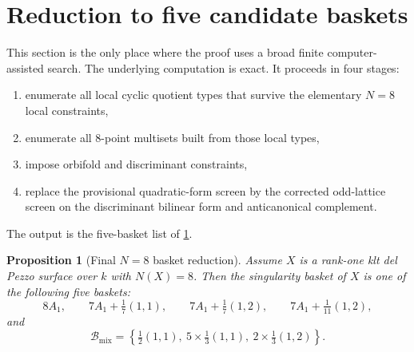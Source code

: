 \documentclass[11pt]{article}
\newtheorem{proposition}[proposition]{Proposition}
\theoremstyle{definition}
\begin{document}
\section{Reduction to five candidate baskets}\label{sec:baskets}

This section is the only place where the proof uses a broad finite computer-assisted search. The underlying computation is exact. It proceeds in four stages:
\begin{enumerate}[label=\textup{(\arabic*)}]
\item enumerate all local cyclic quotient types that survive the elementary $N=8$ local constraints,
\item enumerate all $8$-point multisets built from those local types,
\item impose orbifold and discriminant constraints,
\item replace the provisional quadratic-form screen by the corrected odd-lattice screen on the discriminant bilinear form and anticanonical complement.
\end{enumerate}
The output is the five-basket list of \cref{prop:final-baskets}.

\begin{proposition}[Final $N=8$ basket reduction]\label{prop:final-baskets}
Assume $X$ is a rank-one klt del Pezzo surface over $k$ with $N(X)=8$. Then the singularity basket of $X$ is one of the following five baskets:
\[
8A_1,
\qquad
7A_1+\tfrac17(1,1),
\qquad
7A_1+\tfrac17(1,2),
\qquad
7A_1+\tfrac1{11}(1,2),
\]
and
\[
\mathcal B_{\mathrm{mix}}=\left\{\tfrac12(1,1),\ 5\times\tfrac13(1,1),\ 2\times\tfrac13(1,2)\right\}.
\]
\end{proposition}
\end{document}
